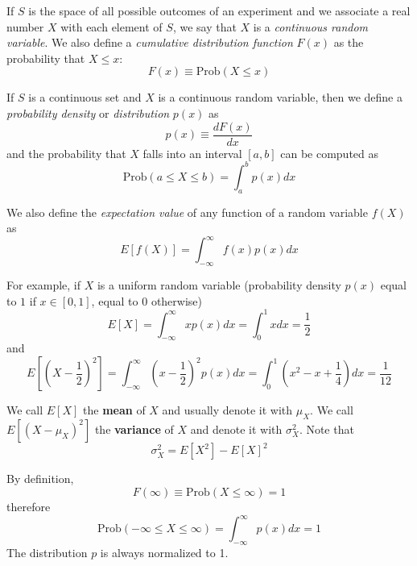 \documentclass[justified, sixbynine]{tufte-book}
\theoremstyle{plain}%
\newtheorem * {corollary}{Corollary}
\theoremstyle{definition}
\theoremstyle{remark}
\newtheorem * {remark}{Remark}
\newtheorem * {note}{Note}
\begin{document}
\begin{fullwidth}
If $S$ is the space of all possible outcomes of an experiment and we
associate a real number $X$ with each element of $S$, we say that $X$ is a {\it %
continuous random variable}. We also define a {\it cumulative distribution
function} $F(x)$ as the probability that $X\leq x$:
\begin{equation}
F(x)\equiv \textrm{Prob}(X\leq x)
\end{equation}

If $S$ is a continuous set and $X$ is a continuous random variable, then we
define a {\it probability density} or {\it distribution} $p(x)$ as
\begin{equation}
p(x)\equiv \frac{dF(x)}{dx}
\end{equation}
and the probability that $X$ falls into an interval $[a, b]$ can be computed
as
\begin{equation}
\textrm{Prob}(a\leq X\leq b)=\int_a^bp(x)dx
\end{equation}


We also define the {\it expectation value} of any function of a random
variable $f(X)$ as
\begin{equation}
E[f(X)]=\int_{-\infty }^\infty f(x)p(x)dx
\end{equation}

For example, if $X$ is a uniform random variable (probability density $p(x)$ equal to $1$ if
$x\in [0, 1]$, equal to $0$ otherwise)
\begin{equation}
E[X]=\int_{-\infty }^\infty xp(x)dx=\int_0^1xdx=\frac 12
\end{equation}
and
\begin{equation}
E[(X-\frac 12)^2]=\int_{-\infty }^\infty (x-\frac
12)^2p(x)dx=\int_0^1(x^2-x+\frac 14)dx=\frac 1{12}
\end{equation}

We call $E[X]$ the {\bf mean} of $X$ and usually denote it with $\mu _X$.
We call $E[(X-\mu _X)^2]$ the {\bf variance} of $X$ and denote it with $%
\sigma _X^2$. Note that
\begin{equation}
\sigma _X^2=E[X^2]-E[X]^2
\end{equation}

By definition, 
\begin{equation}
F(\infty )\equiv \textrm{Prob}(X\leq \infty )=1
\end{equation}
therefore
\begin{equation}
\textrm{Prob}(-\infty \leq X\leq \infty )=\int_{-\infty }^\infty p(x)dx=1
\end{equation}
The distribution $p$ is always normalized to 1.


\end{fullwidth}
\end{document}
